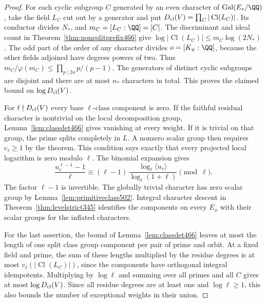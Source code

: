\documentclass[a4paper,11pt]{article}
\theoremstyle{definition}
\theoremstyle{remark}
\numberwithin{equation}{section}
\newcommand{\Cl}{\operatorname{Cl}}
\begin{document}
\begin{proof}
For each cyclic subgroup \(C\) generated by an even character of
\(\operatorname{Gal}(E_*/\QQ)\), take the field \(L_C\) cut out
by a generator and put \(D_{\rm cl}(V)=\prod_C|\Cl(L_C)|\). Its conductor
divides \(N_*\), and \(m_C=[L_C:\QQ]=|C|\). The discriminant
and ideal count in Theorem~\ref{thm:nonsplitprefix466} give
\(\log|\Cl(L_C)|\le m_C\log(2N_*)\). The odd part of the order
of any character divides \(o=[K_\psi:\QQ]\), because the other
fields adjoined have degrees powers of two. Thus
\(m_C/\varphi(m_C)\le\prod_{p\mid2o}p/(p-1)\).
The generators of distinct cyclic subgroups are disjoint and
there are at most \(n_*\) characters in total. This proves the
claimed bound on \(\log D_{\rm cl}(V)\).

For \(\ell\nmid D_{\rm cl}(V)\) every base \(\ell\)-class component is
zero. If the faithful residual character is nontrivial on the
local decomposition group, Lemma~\ref{lem:classdet466} gives
vanishing at every weight. If it is trivial on that group,
the prime splits completely in \(L\). A nonzero scalar group
then requires \(c_\tau\ge1\) by the theorem. This condition
says exactly that every projected local logarithm is zero
modulo \(\ell\). The binomial expansion gives
\[
 \frac{u_v^{\ell-1}-1}{\ell}
     \equiv (\ell-1)\,
        \frac{\log_\ell\langle u_v\rangle}{\log_\ell(1+\ell)}
                                                     \pmod\ell .
\]
The factor \(\ell-1\) is invertible. The globally trivial
character has zero scalar group by Lemma~\ref{lem:primitiveclass502}.
Integral character descent in Theorem~\ref{thm:levelstrict345}
identifies the components on every \(E_x\) with their scalar
groups for the inflated characters.

For the last assertion, the bound of Lemma~\ref{lem:classdet466}
leaves at most the length of one split class group component
per pair of prime and orbit. At a fixed field and prime,
the sum of these lengths multiplied by the residue degrees is
at most \(v_\ell(|\Cl(L_C)|)\), since the components have
orthogonal integral idempotents. Multiplying by \(\log\ell\)
and summing over all primes and all \(C\) gives at most
\(\log D_{\rm cl}(V)\). Since all residue degrees are at least one and
\(\log\ell\ge1\), this also bounds the number of exceptional
weights in their union.
\end{proof}
\end{document}
